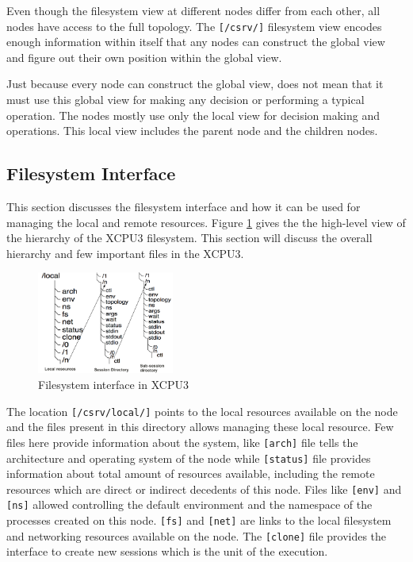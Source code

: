 Even though the filesystem view at different nodes differ from each other, 
all nodes have access to the full topology.  The \texttt{[/csrv/]} filesystem
view encodes enough information within itself that any nodes can construct the
global view and figure out their own position within the global view.

Just because every node can construct the global view, does not mean that it
must use this global view for making any decision or performing a typical
operation. The nodes mostly use only the local view for decision making and
operations. This local view includes the parent node and the children nodes.


\subsection{Filesystem Interface}

This section discusses the filesystem interface and how it can be used for
managing the local and remote resources. Figure \ref{fig:xcpu3Local} gives the
the high-level view of the hierarchy of the XCPU3 filesystem.  This section
will discuss the overall hierarchy and few important files in the XCPU3.

\begin{figure}[h]
  \begin{center}
    \leavevmode
      \includegraphics[height=0.25\textheight,width=0.4\textwidth]
		{./img/local_session_subsessions}
    \caption{Filesystem interface in XCPU3}
    \label{fig:xcpu3Local}
  \end{center}
\end{figure}

The location \texttt{[/csrv/local/]} points to the local resources available on
the node and the files present in this directory allows managing these local
resource. Few files here provide information about the system, like
\texttt{[arch]} file tells the architecture and operating system of the node
while \texttt{[status]} file provides information about total amount of
resources available, including the remote resources which are direct or
indirect decedents of this node.  Files like \texttt{[env]} and \texttt{[ns]}
allowed controlling the default environment and the namespace of the processes
created on this node.  \texttt{[fs]} and \texttt{[net]} are links to the local
filesystem and networking resources available on the node.  The
\texttt{[clone]} file provides the interface to create new sessions which is
the unit of the execution.

